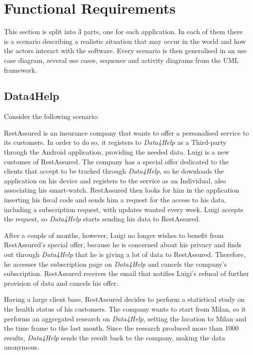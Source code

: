 \section{Functional Requirements}
    This section is split into 3 parts, one for each application. In each of them there is a scenario describing a realistic situation that may occur in the world and how the actors interact with the software. Every scenario is then generalised in an use case diagram, several use cases,  sequence and activity diagrams from the UML framework.
    \subsection{Data4Help}
        Consider the following scenario:
        
        RestAssured is an insurance company that wants to offer a personalised service to its customers. In order to do so, it registers to \emph{Data4Help} as a Third-party through the Android application, providing the needed data. Luigi is a new customer of RestAssured. The company has a special offer dedicated to the clients that accept to be tracked through \emph{Data4Help}, so he downloads the application on his device and registers to the service as an Individual, also associating his smart-watch. RestAssured then looks for him in the application inserting his fiscal code and sends him a request for the access to his data, including a subscription request, with updates wanted every week. Luigi accepts the request, so \emph{Data4Help} starts sending his data to RestAssured.
        
        After a couple of months, however, Luigi no longer wishes to benefit from RestAssured's special offer, because he is concerned about his privacy and finds out through \emph{Data4Help} that he is giving a lot of data to RestAssured. Therefore, he accesses the subscription page on \emph{Data4Help} and cancels the company's subscription. RestAssured receives the email that notifies Luigi's refusal of further provision of data and cancels his offer.
        
        Having a large client base, RestAssured decides to perform a statistical study on the health status of his customers. The company wants to start from Milan, so it performs an aggregated research on \emph{Data4Help}, setting the location to Milan and the time frame to the last month. Since the research produced more than 1000 results, \emph{Data4Help} sends the result back to the company, making the data anonymous.
        
